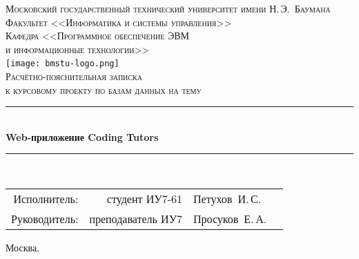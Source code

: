 \newcommand{\HRule}{\rule{\linewidth}{0.5mm}}

\begin{center}

\textsc{\large Московский государственный технический университет имени Н.\,Э.~Баумана}\\[0.5cm]
\textsc{Факультет <<Информатика и системы управления>>}\\
\textsc{Кафедра <<Программное обеспечение ЭВМ\\и информационные технологии>>}\\[0.25cm]

\texttt{[image: bmstu-logo.png]}~\\[2.25cm]

\textsc{\large Расчётно-пояснительная записка}\\
\textsc{к курсовому проекту по базам данных на тему}

\HRule \\[0.5cm]
{\huge \bfseries Web-приложение Coding Tutors}

\HRule \\[0.5cm]

\vfill

\begin{flushright}
  \begin{tabular}{rrlc}
    Исполнитель:  &    студент ИУ7-61 & Петухов~И.\,С.  & \underline{\hspace{3cm}} \\[1cm]
    Руководитель: & преподаватель ИУ7 & Просуков~Е.\,А. & \underline{\hspace{3cm}} \\[1cm]
  \end{tabular}
\end{flushright}

{\large Москва, \the\year}

\end{center}

\newpage
{}